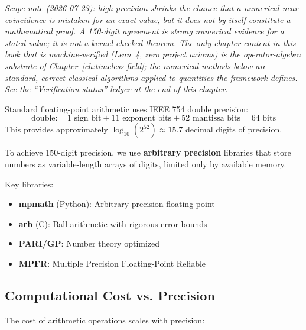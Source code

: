 \noindent\emph{Scope note (2026-07-23): high precision shrinks the chance that a numerical near-coincidence is mistaken for an exact value, but it does not by itself constitute a mathematical proof. A 150-digit agreement is strong numerical \emph{evidence} for a stated value; it is not a kernel-checked theorem. The only chapter content in this book that is machine-verified (Lean~4, zero project axioms) is the operator-algebra substrate of Chapter~\ref{ch:timeless-field}; the numerical methods below are standard, correct classical algorithms applied to quantities the framework defines. See the ``Verification status'' ledger at the end of this chapter.}

Standard floating-point arithmetic uses IEEE 754 double precision:
\begin{equation}
\text{double}: \quad 1 \text{ sign bit} + 11 \text{ exponent bits} + 52 \text{ mantissa bits} = 64 \text{ bits}
\end{equation}
This provides approximately $\log_{10}(2^{52}) \approx 15.7$ decimal digits of precision.

\begin{keyidea}
To achieve 150-digit precision, we use \textbf{arbitrary precision} libraries that store numbers as variable-length arrays of digits, limited only by available memory.

Key libraries:
\begin{itemize}
\item \textbf{mpmath} (Python): Arbitrary precision floating-point
\item \textbf{arb} (C): Ball arithmetic with rigorous error bounds
\item \textbf{PARI/GP}: Number theory optimized
\item \textbf{MPFR}: Multiple Precision Floating-Point Reliable
\end{itemize}
\end{keyidea}

\subsection{Computational Cost vs. Precision}

The cost of arithmetic operations scales with precision:

